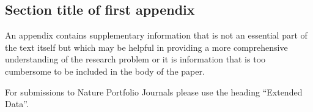 \documentclass[sn-apa,pdflatex]{sn-jnl}
\theoremstyle{remark}
\theoremstyle{definition}
\begin{document}
\begin{appendices}

\hypertarget{secA1}{%
\section{Section title of first appendix}\label{secA1}}

An appendix contains supplementary information that is not an essential
part of the text itself but which may be helpful in providing a more
comprehensive understanding of the research problem or it is information
that is too cumbersome to be included in the body of the paper.

For submissions to Nature Portfolio Journals please use the heading
``Extended Data''.

\end{appendices}


\end{document}
